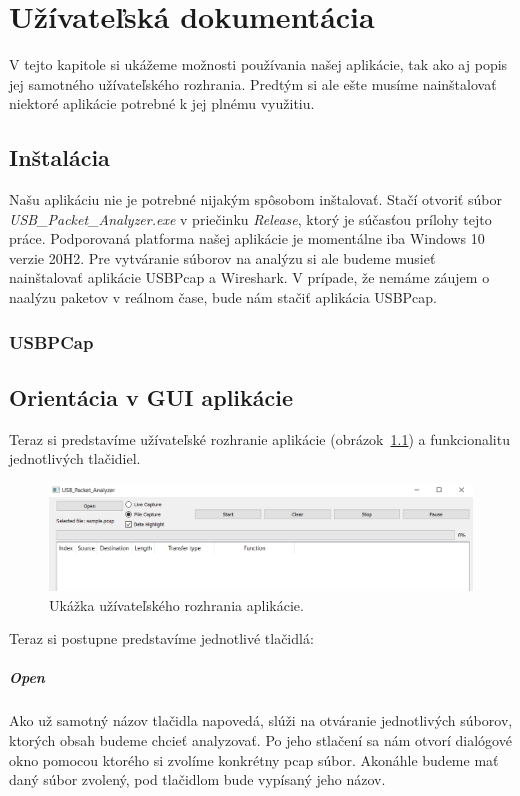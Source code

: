 \chapter{Užívateľská dokumentácia}
\label{udok:chap}

V tejto kapitole si ukážeme možnosti používania našej aplikácie, tak ako aj popis jej samotného užívateľského rozhrania. Predtým si ale ešte musíme nainštalovať niektoré aplikácie potrebné k jej plnému využitiu.

\section{Inštalácia}
Našu aplikáciu nie je potrebné nijakým spôsobom inštalovať. Stačí otvoriť súbor \textit{USB\_Packet\_Analyzer.exe} v priečinku \textit{Release}, ktorý je súčasťou prílohy tejto práce. Podporovaná platforma našej aplikácie je momentálne iba Windows 10 verzie 20H2. Pre vytváranie súborov na analýzu si ale budeme musieť nainštalovať aplikácie USBPcap a Wireshark. V prípade, že nemáme záujem o naalýzu paketov v reálnom čase, bude nám stačiť aplikácia USBPcap.

\subsection{USBPCap}




\section{Orientácia v GUI aplikácie}
Teraz si predstavíme užívateľské rozhranie aplikácie (obrázok~\ref{obr:kap6:gui}) a funkcionalitu jednotlivých tlačidiel. 

\begin{figure}[!htb]
	\centering
	\includegraphics[width=\textwidth]{img/kap06_gui}
	\caption{Ukážka užívateľského rozhrania aplikácie.}
	\label{obr:kap6:gui}
\end{figure}

Teraz si postupne predstavíme jednotlivé tlačidlá:

\paragraph{Open} 
\hfill\break
Ako už samotný názov tlačidla napovedá, slúži na otváranie jednotlivých súborov, ktorých obsah budeme chcieť analyzovať.
Po jeho stlačení sa nám otvorí dialógové okno pomocou ktorého si zvolíme konkrétny pcap súbor. Akonáhle budeme mať daný súbor zvolený, pod tlačidlom bude vypísaný jeho názov.

